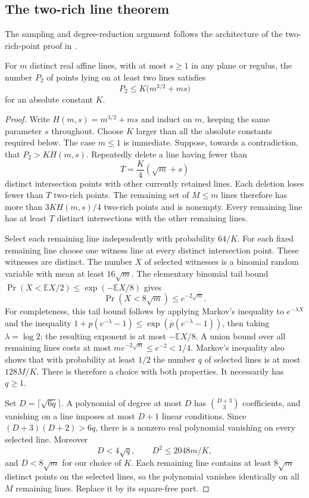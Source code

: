 \subsection{The two-rich line theorem}

The sampling and degree-reduction argument follows the architecture of
the two-rich-point proof in \cite[Section~3]{guthkatz2015}.

\begin{theorem}\label{ci:two-rich}
For $m$ distinct real affine lines, with at most $s\ge1$ in any
plane or regulus, the number $P_2$ of points lying on at least two
lines satisfies
\[
 P_2\le K\bigl(m^{3/2}+ms\bigr)
\]
for an absolute constant $K$.
\end{theorem}

\begin{proof}
Write $H(m,s)=m^{3/2}+ms$ and induct on $m$, keeping the same
parameter $s$ throughout.  Choose $K$ larger than all the absolute
constants required below.  The case $m\le1$ is immediate.
Suppose, towards a contradiction, that $P_2>KH(m,s)$.  Repeatedly
delete a line having fewer than
\[
 T=\frac K4(\sqrt m+s)
\]
distinct intersection points with other currently retained lines.
Each deletion loses fewer than $T$ two-rich points.  The remaining
set of $M\le m$ lines therefore has more than $3KH(m,s)/4$
two-rich points and is nonempty.  Every remaining line has at
least $T$ distinct intersections with the other remaining lines.

Select each remaining line independently with probability $64/K$.
For each fixed remaining line choose one witness line at every
distinct intersection point.  These witnesses are distinct.  The
number $X$ of selected witnesses is a binomial random variable
with mean at least $16\sqrt m$.  The elementary binomial tail
bound $\Pr(X<\mathbb EX/2)\le\exp(-\mathbb EX/8)$ gives
\[
 \Pr(X<8\sqrt m)\le e^{-2\sqrt m}.
\]
For completeness, this tail bound follows by applying Markov's
inequality to $e^{-\lambda X}$ and the inequality
$1+p(e^{-\lambda}-1)\le\exp(p(e^{-\lambda}-1))$, then taking
$\lambda=\log2$; the resulting exponent is at most
$-\mathbb EX/8$.  A union bound over all remaining lines costs at
most $me^{-2\sqrt m}\le e^{-2}<1/4$.  Markov's inequality also
shows that with probability at least $1/2$ the number $q$ of
selected lines is at most $128M/K$.  There is therefore a choice
with both properties.  It necessarily has $q\ge1$.

Set $D=\lceil\sqrt{6q}\rceil$.  A polynomial of degree at most
$D$ has $\binom{D+3}{3}$ coefficients, and vanishing on a line
imposes at most $D+1$ linear conditions.  Since
$(D+3)(D+2)>6q$, there is a nonzero real polynomial vanishing on
every selected line.  Moreover
\[
 D<4\sqrt q,\qquad D^2\le2048m/K,
\]
and $D<8\sqrt m$ for our choice of $K$.  Each remaining line
contains at least $8\sqrt m$ distinct points on the selected
lines, so the polynomial vanishes identically on all $M$ remaining
lines.  Replace it by its square-free part.


\end{proof}

